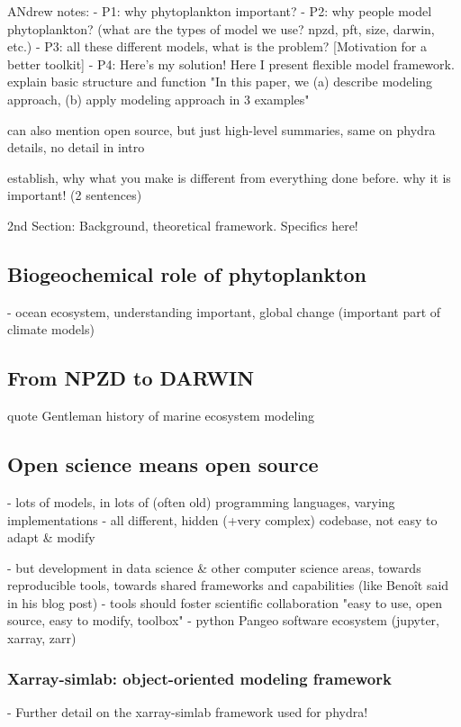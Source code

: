 \documentclass[journal abbreviation, manuscript]{copernicus}
\begin{document}
\introduction  %

ANdrew notes:
- P1: why phytoplankton important?
- P2: why people model phytoplankton? (what are the types of model we use? npzd, pft, size, darwin, etc.)
- P3: all these different models, what is the problem? [Motivation for a better toolkit]
- P4: Here's my solution! Here I present flexible model framework. explain basic structure and function
"In this paper, we (a) describe modeling approach, (b) apply modeling approach in 3 examples"

can also mention open source, but just high-level summaries, same on phydra details, no detail in intro

establish, why what you make is different from everything done before. why it is important! (2 sentences)

2nd Section:
Background, theoretical framework. Specifics here!


\subsection{Biogeochemical role of phytoplankton}
- ocean ecosystem, understanding important, global change (important part of climate models)

\subsection{From NPZD to DARWIN}
quote Gentleman history of marine ecosystem modeling


\subsection{Open science means open source}
- lots of models, in lots of (often old) programming languages, varying implementations
- all different, hidden (+very complex) codebase, not easy to adapt \& modify

- but development in data science & other computer science areas, towards reproducible tools, towards shared frameworks and capabilities (like Benoît said in his blog post)
- tools should foster scientific collaboration
"easy to use, open source, easy to modify, toolbox"
- python Pangeo software ecosystem (jupyter, xarray, zarr)

\subsubsection{Xarray-simlab: object-oriented modeling framework}
- Further detail on the xarray-simlab framework used for phydra!
\end{document}
